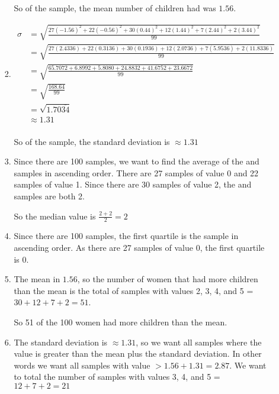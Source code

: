 \documentclass[12pt,letterpaper]{article}
\begin{document}
\begin{enumerate}
\begin{enumerate}
\begin{enumerate}[label=(\arabic*)]
              So of the sample, the mean number of children had was $1.56$.

            \item
              \begin{align*}
                \sigma &= \sqrt{\frac{27(-1.56)^2 + 22(-0.56)^2 + 30(0.44)^2 + 12(1.44)^2 + 7(2.44)^2 + 2(3.44)^2}{99}} \\
                &=\sqrt{\frac{27(2.4336) + 22(0.3136) + 30(0.1936) + 12(2.0736) + 7(5.9536) + 2(11.8336)}{99}} \\
                &=\sqrt{\frac{65.7072 + 6.8992 + 5.8080 + 24.8832 + 41.6752 + 23.6672}{99}} \\
                &=\sqrt{\frac{168.64}{99}} \\
                &=\sqrt{1.70\overline{34}} \\
                &\approx 1.31 \\
              \end{align*}

              So of the sample, the standard deviation is $\approx 1.31$

            \item
              Since there are 100 samples,
              we want to find the average of the  and  samples in ascending order.
              There are 27 samples of value 0 and 22 samples of value 1.
              Since there are 30 samples of value 2,
              the  and  samples are both 2.

              So the median value is $\frac{2 + 2}{2} = 2$

            \item

              Since there are 100 samples,
              the first quartile is the  sample in ascending order.
              As there are 27 samples of value 0,
              the first quartile is 0.

            \item
              The mean in $1.56$,
              so the number of women that had more children than the mean
              is the total of samples with values 2, 3, 4, and 5 = $30 + 12 + 7 + 2 = 51$.

              So 51 of the 100 women had more children than the mean.

            \item
              The standard deviation is $\approx 1.31$,
              so we want all samples where the value is greater than the mean plus the standard deviation.
              In other words we want all samples with value $> 1.56 + 1.31 = 2.87$.
              We want to total the number of samples with values 3, 4, and 5 = $12 + 7 + 2 = 21$


\end{enumerate}
\end{enumerate}
\end{enumerate}
\end{document}
